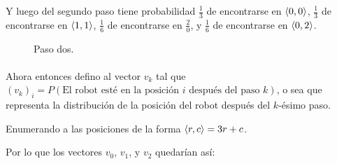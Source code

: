 \documentclass[../main.tex]{subfiles}
\begin{document}
Y luego del segundo paso tiene probabilidad \(\frac{1}{3}\) de encontrarse en \(\langle 0, 0 \rangle\), \(\frac{1}{3}\) de encontrarse en \(\langle 1, 1 \rangle\), \(\frac{1}{6}\) de encontrarse en \(\frac{2}{0}\), y \(\frac{1}{6}\) de encontrarse en \(\langle 0, 2 \rangle\).

\begin{figure}[H]
  \centering
  \caption{Paso dos.}
\end{figure}

\paragraph{} Ahora entonces defino al vector \(v_{k}\) tal que \((v_{k})_{i} = P(\text{El robot esté en la posición } i \text{ después del paso } k)\), o sea que representa la distribución de la posición del robot después del \(k\)-ésimo paso.

Enumerando a las posiciones de la forma \(\langle r, c \rangle = 3r + c\).

Por lo que los vectores \(v_{0}\), \(v_{1}\), y \(v_{2}\) quedarían así:
\end{document}

